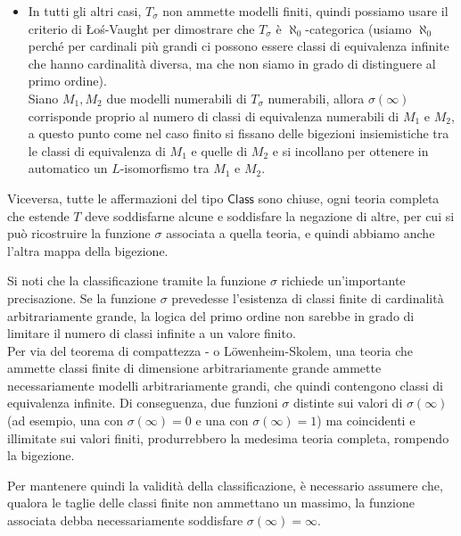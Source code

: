 \begin{soln}
\begin{itemize}
        A questo punto è ovvio che tutti i modelli di $T_{\sigma}$ sono isomorfi, perché possiamo costruire un $L$-isomorfismo incollando gli isomorfismi tra le classi di equivalenza, che sono a loro volta banalmente definiti dalle bigezioni insiemistiche. Incollando isomorfismi delle classi di equivalenza di stessa cardinalità si ottiene un isomorfismo tra i modelli.
        Segue che questa $T_{\sigma}$ è completa perché ha un solo modello finito a meno di $L$-isomorfismo.
        \item In tutti gli altri casi, $T_{\sigma}$ non ammette modelli finiti, quindi possiamo usare il criterio di Łoś-Vaught per dimostrare che $T_\sigma$ è $\aleph_0$-categorica (usiamo $\aleph_0$ perché per cardinali più grandi ci possono essere classi di equivalenza infinite che hanno cardinalità diversa, ma che non siamo in grado di distinguere al primo ordine).\\
        Siano $M_1, M_2$ due modelli numerabili di $T_{\sigma}$ numerabili, allora $\sigma(\infty)$ corrisponde proprio al numero di classi di equivalenza numerabili di $M_1$ e $M_2$, a questo punto come nel caso finito si fissano delle bigezioni insiemistiche tra le classi di equivalenza di $M_1$ e quelle di $M_2$ e si incollano per ottenere in automatico un $L$-isomorfismo tra $M_1$ e $M_2$.
    \end{itemize}
    Viceversa, tutte le affermazioni del tipo $\mathsf{Class}$ sono chiuse, ogni teoria completa che estende $T$ deve soddisfarne alcune e soddisfare la negazione di altre, per cui si può ricostruire la funzione $\sigma$ associata a quella teoria, e quindi abbiamo anche l'altra mappa della bigezione.
\end{soln}

\enlargethispage{1\baselineskip}
\begin{remark}
    Si noti che la classificazione tramite la funzione $\sigma$ richiede un'importante precisazione. Se la funzione $\sigma$ prevedesse l'esistenza di classi finite di cardinalità arbitrariamente grande, la logica del primo ordine non sarebbe in grado di limitare il numero di classi infinite a un valore finito.\\
    Per via del teorema di compattezza - o Löwenheim-Skolem, una teoria che ammette classi finite di dimensione arbitrariamente grande ammette necessariamente modelli arbitrariamente grandi, che quindi contengono classi di equivalenza infinite.
    Di conseguenza, due funzioni $\sigma$ distinte sui valori di $\sigma(\infty)$ (ad esempio, una con $\sigma(\infty) = 0$ e una con $\sigma(\infty) = 1$) ma coincidenti e illimitate sui valori finiti, produrrebbero la medesima teoria completa, rompendo la bigezione.
\end{remark}

Per mantenere quindi la validità della classificazione, è necessario assumere che, qualora le taglie delle classi finite non ammettano un massimo, la funzione associata debba necessariamente soddisfare $\sigma(\infty) = \infty$.